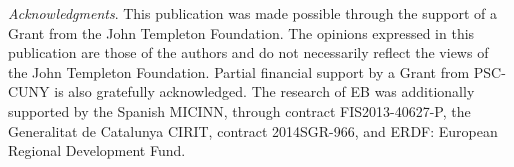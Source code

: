 \documentclass[aps,prl,twocolumn,showpacs]{revtex4}
\begin{document}
\begin{acknowledgments}
\emph{Acknowledgments}. This publication was made possible through the support of a Grant from the John Templeton Foundation. The opinions expressed in this publication are those of the authors and do not necessarily reflect the views of the John Templeton Foundation. Partial financial support by a Grant from PSC-CUNY is also gratefully acknowledged. The research of EB was additionally supported by 
the Spanish MICINN, through contract FIS2013-40627-P, the Generalitat de
Catalunya CIRIT, contract  2014SGR-966, and ERDF: European Regional Development Fund.
\end{acknowledgments}





%
%  
\end{document}
